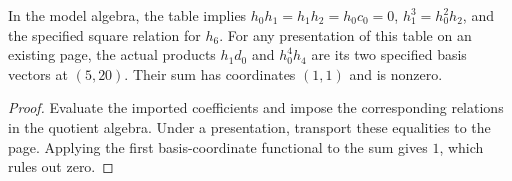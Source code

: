 \begin{lemma}
  \label{lem:lin-low-degree-table-relations}
  \leanok
  In the model algebra, the table implies
  $h_0h_1=h_1h_2=h_0c_0=0$, $h_1^3=h_0^2h_2$, and the specified
  square relation for $h_6$.
  For any presentation of this table on an existing page, the actual products
  $h_1d_0$ and $h_0^4h_4$ are its two specified basis vectors at $(5,20)$.
  Their sum has coordinates $(1,1)$ and is nonzero.
\end{lemma}
\begin{proof}
  \leanok
  Evaluate the imported coefficients and impose the corresponding relations
  in the quotient algebra.  Under a presentation, transport these equalities
  to the page.  Applying the first basis-coordinate functional to the sum
  gives $1$, which rules out zero.
\end{proof}
